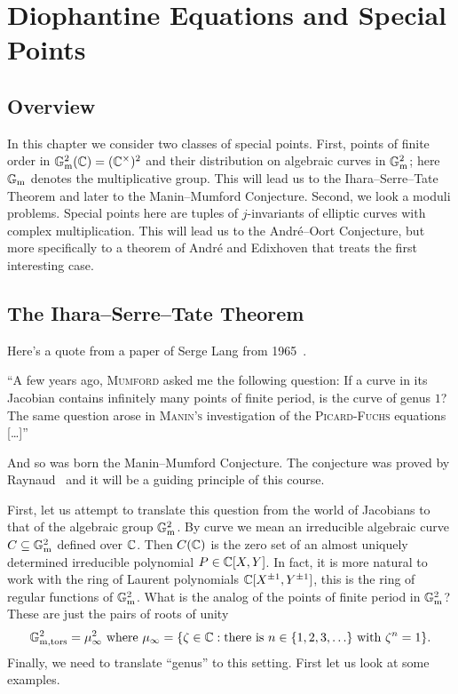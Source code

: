 \chapter{Diophantine Equations and Special Points}

\section{Overview}

In this chapter we consider two classes of special points. First,
points of finite order in ${\mathbb{G}}_{\mathrm{m}}^2({\mathbb{C}})=({\mathbb{C}}^\times)^2$ and their distribution on
algebraic curves in ${\mathbb{G}}_{\mathrm{m}}^2$; here ${\mathbb{G}}_{\mathrm{m}}$ denotes the multiplicative
group. This will lead us to the
Ihara--Serre--Tate Theorem and later to the Manin--Mumford Conjecture.
Second, we look a moduli problems. Special points here are tuples of
$j$-invariants of elliptic curves with complex multiplication. This
will lead us to the Andr\'e--Oort Conjecture, but more specifically to
a theorem of Andr\'e and Edixhoven that treats the first interesting
case. 

\section{The Ihara--Serre--Tate Theorem}
\label{sec:ist}

Here's a quote from a paper of Serge Lang from
1965~\cite{Lang:Division}.

\begin{displayquote}
  ``A few years ago, \textsc{Mumford} asked me the following question:
  If a curve in its Jacobian contains infinitely many points of finite
  period, is the curve of genus $1$? The same question arose in
  \textsc{Manin's} investigation of the \textsc{Picard-Fuchs}
  equations [\ldots]''
\end{displayquote}
And so was born the Manin--Mumford Conjecture. The conjecture was
proved by Raynaud~\cite{Raynaud:MM} and it will be a guiding principle of this
course. 

First, let us attempt to translate this question
from the world of Jacobians to that  of the algebraic group ${\mathbb{G}}_{\mathrm{m}}^2$. By
curve we mean an irreducible algebraic curve $C\subseteq
{\mathbb{G}}_{\mathrm{m}}^2$ defined over ${\mathbb{C}}$. Then $C({\mathbb{C}})$ is
the zero set of
an almost uniquely determined irreducible polynomial $P\in {\mathbb{C}}[X,Y]$.
In fact, it is more natural to work with the ring of
Laurent polynomials ${\mathbb{C}}[X^{\pm 1},Y^{\pm 1}]$, this is the ring of
regular functions of ${\mathbb{G}}_{\mathrm{m}}^2$.
What is the analog of the points of finite period in ${\mathbb{G}}_{\mathrm{m}}^2$?
These are just the pairs of roots of unity
$$ {\mathbb{G}}^2_{{\mathrm{m}},\mathrm{tors}}= \mu_\infty^2  \text{ where
}\mu_\infty = \{\zeta\in{\mathbb{C}} : \text{there is $n\in\{1,2,3,\ldots\}$
  with }\zeta^n=1 \}.$$
Finally, we need to translate ``genus'' to this setting. First let us
look at some examples.

